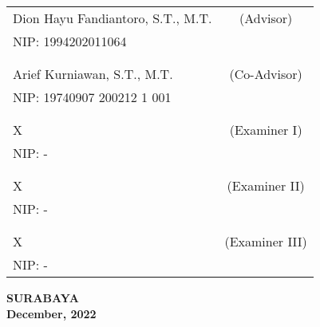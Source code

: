     \noindent
    \begin{tabularx}{\textwidth}{X c}
      Dion Hayu Fandiantoro, S.T., M.T.     & (Advisor) \\
      NIP: 1994202011064                    & \\
      &  \\
      &  \\
      Arief Kurniawan, S.T., M.T.           & (Co-Advisor) \\
      NIP: 19740907 200212 1 001            & \\
      &  \\
      &  \\
      X                                     & (Examiner I) \\
      NIP: -                                & \\
      &  \\
      &  \\
      X                                     & (Examiner II) \\
      NIP: -                                & \\
      &  \\
      &  \\
      X                                     & (Examiner III) \\
      NIP: -                                & \\
    \end{tabularx}
  \endgroup

  \vspace{4ex}

  \begin{center}
    \textbf{SURABAYA} \\
    \textbf{December, 2022}
  \end{center}
\endgroup
